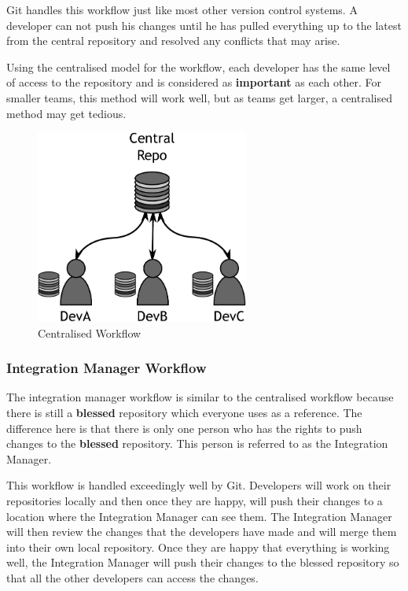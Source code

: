Git handles this workflow just like most other version control systems.  A developer can not push his changes until he has pulled everything up to the latest from the central repository and resolved any conflicts that may arise.

Using the centralised model for the workflow, each developer has the same level of access to the repository and is considered as \textbf{important} as each other.  For smaller teams, this method will work well, but as teams get larger, a centralised method may get tedious.

\begin{figure}[bt]
	\centering
	\includegraphics[width=7cm]{images/f-w1-d1.pdf}
	\caption{Centralised Workflow}
\end{figure}

\subsubsection{Integration Manager Workflow}
The integration manager workflow is similar to the centralised workflow because there is still a \textbf{blessed} repository which everyone uses as a reference.  The difference here is that there is only one person who has the rights to push changes to the \textbf{blessed} repository.  This person is referred to as the Integration Manager.  

This workflow is handled exceedingly well by Git.  Developers will work on their repositories locally and then once they are happy, will push their changes to a location where the Integration Manager can see them.  The Integration Manager will then review the changes that the developers have made and will merge them into their own local repository.  Once they are happy that everything is working well, the Integration Manager will push their changes to the blessed repository so that all the other developers can access the changes.

